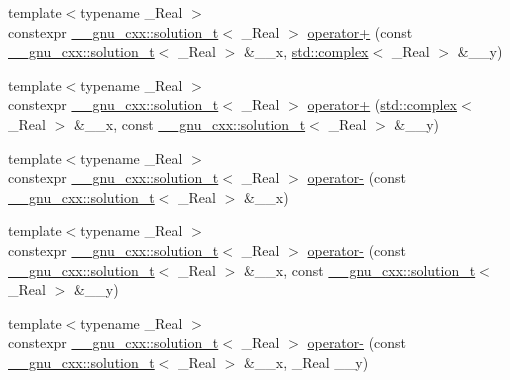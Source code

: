 \begin{DoxyCompactItemize}
\item 
{\footnotesize template$<$typename \+\_\+\+Real $>$ }\\constexpr \hyperlink{namespace____gnu__cxx_ae20ea642de50eb361074c62676b0159c}{\+\_\+\+\_\+gnu\+\_\+cxx\+::solution\+\_\+t}$<$ \+\_\+\+Real $>$ \hyperlink{namespacestd_a7c7a048cefad54d71198cecef43ff7bd}{operator+} (const \hyperlink{namespace____gnu__cxx_ae20ea642de50eb361074c62676b0159c}{\+\_\+\+\_\+gnu\+\_\+cxx\+::solution\+\_\+t}$<$ \+\_\+\+Real $>$ \&\+\_\+\+\_\+x, \hyperlink{classstd_1_1complex}{std\+::complex}$<$ \+\_\+\+Real $>$ \&\+\_\+\+\_\+y)
\item 
{\footnotesize template$<$typename \+\_\+\+Real $>$ }\\constexpr \hyperlink{namespace____gnu__cxx_ae20ea642de50eb361074c62676b0159c}{\+\_\+\+\_\+gnu\+\_\+cxx\+::solution\+\_\+t}$<$ \+\_\+\+Real $>$ \hyperlink{namespacestd_aa471e6e6583f0beced389171490d8684}{operator+} (\hyperlink{classstd_1_1complex}{std\+::complex}$<$ \+\_\+\+Real $>$ \&\+\_\+\+\_\+x, const \hyperlink{namespace____gnu__cxx_ae20ea642de50eb361074c62676b0159c}{\+\_\+\+\_\+gnu\+\_\+cxx\+::solution\+\_\+t}$<$ \+\_\+\+Real $>$ \&\+\_\+\+\_\+y)
\item 
{\footnotesize template$<$typename \+\_\+\+Real $>$ }\\constexpr \hyperlink{namespace____gnu__cxx_ae20ea642de50eb361074c62676b0159c}{\+\_\+\+\_\+gnu\+\_\+cxx\+::solution\+\_\+t}$<$ \+\_\+\+Real $>$ \hyperlink{namespacestd_a6cd0256e6734f6ff66ad5e4f9d4f1741}{operator-\/} (const \hyperlink{namespace____gnu__cxx_ae20ea642de50eb361074c62676b0159c}{\+\_\+\+\_\+gnu\+\_\+cxx\+::solution\+\_\+t}$<$ \+\_\+\+Real $>$ \&\+\_\+\+\_\+x)
\item 
{\footnotesize template$<$typename \+\_\+\+Real $>$ }\\constexpr \hyperlink{namespace____gnu__cxx_ae20ea642de50eb361074c62676b0159c}{\+\_\+\+\_\+gnu\+\_\+cxx\+::solution\+\_\+t}$<$ \+\_\+\+Real $>$ \hyperlink{namespacestd_ad3462eddf6b43f6e2d87b7a5fa2a2307}{operator-\/} (const \hyperlink{namespace____gnu__cxx_ae20ea642de50eb361074c62676b0159c}{\+\_\+\+\_\+gnu\+\_\+cxx\+::solution\+\_\+t}$<$ \+\_\+\+Real $>$ \&\+\_\+\+\_\+x, const \hyperlink{namespace____gnu__cxx_ae20ea642de50eb361074c62676b0159c}{\+\_\+\+\_\+gnu\+\_\+cxx\+::solution\+\_\+t}$<$ \+\_\+\+Real $>$ \&\+\_\+\+\_\+y)
\item 
{\footnotesize template$<$typename \+\_\+\+Real $>$ }\\constexpr \hyperlink{namespace____gnu__cxx_ae20ea642de50eb361074c62676b0159c}{\+\_\+\+\_\+gnu\+\_\+cxx\+::solution\+\_\+t}$<$ \+\_\+\+Real $>$ \hyperlink{namespacestd_a35af0b87e94fb38640fa36b7ec161645}{operator-\/} (const \hyperlink{namespace____gnu__cxx_ae20ea642de50eb361074c62676b0159c}{\+\_\+\+\_\+gnu\+\_\+cxx\+::solution\+\_\+t}$<$ \+\_\+\+Real $>$ \&\+\_\+\+\_\+x, \+\_\+\+Real \+\_\+\+\_\+y)

\end{DoxyCompactItemize}
